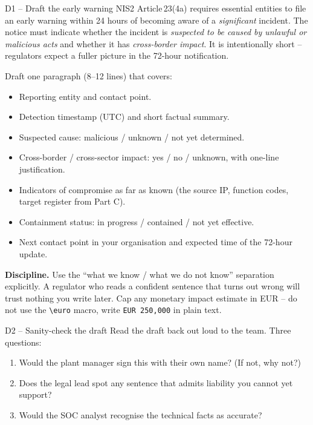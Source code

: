 \documentclass[11pt,a4paper]{article}
\begin{document}
\begin{stepbox}{D1 -- Draft the early warning}
NIS2 Article\,23(4a) requires essential entities to file an early warning within 24 hours of becoming aware of a \emph{significant} incident. The notice must indicate whether the incident is \emph{suspected to be caused by unlawful or malicious acts} and whether it has \emph{cross-border impact}. It is intentionally short -- regulators expect a fuller picture in the 72-hour notification.

Draft one paragraph (8--12 lines) that covers:
\begin{itemize}\setlength{\itemsep}{1pt}
  \item Reporting entity and contact point.
  \item Detection timestamp (UTC) and short factual summary.
  \item Suspected cause: malicious / unknown / not yet determined.
  \item Cross-border / cross-sector impact: yes / no / unknown, with one-line justification.
  \item Indicators of compromise as far as known (the source IP, function codes, target register from Part C).
  \item Containment status: in progress / contained / not yet effective.
  \item Next contact point in your organisation and expected time of the 72-hour update.
\end{itemize}

\textbf{Discipline.} Use the ``what we know / what we do not know'' separation explicitly. A regulator who reads a confident sentence that turns out wrong will trust nothing you write later. Cap any monetary impact estimate in EUR -- do not use the \texttt{\textbackslash{}euro} macro, write \texttt{EUR\,250{,}000} in plain text.
\end{stepbox}

\begin{stepbox}{D2 -- Sanity-check the draft}
Read the draft back out loud to the team. Three questions:
\begin{enumerate}\setlength{\itemsep}{1pt}
  \item Would the plant manager sign this with their own name? (If not, why not?)
  \item Does the legal lead spot any sentence that admits liability you cannot yet support?
  \item Would the SOC analyst recognise the technical facts as accurate?
\end{enumerate}
\end{stepbox}
\end{document}
